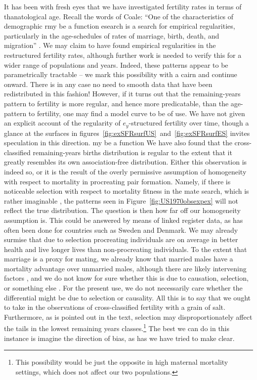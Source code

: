 It has been with fresh eyes that we have investigated fertility rates in terms
of thanatological age. Recall the words of Coale:
``One of the characteristics of demographic rmy be
a function esearch is a search for empirical regularities, particularly in the
age-schedules of rates of marriage, birth, death, and
migration'' \citep{coale1996development}. We may claim to have found
empirical regularities in the restructured fertility rates, although further
work is needed to verify this for a wider range of populations and years.
Indeed, these patterns appear to be parametrically tractable -- we mark this 
possibility with a cairn and continue onward. There is in any case no need to smooth data that
have been redistributed in this fashion! However, if it turns out that the
remaining-years pattern to fertility is more regular, and hence more
predicatable, than the age-pattern to fertility, one may find a model curve to
be of use. We have not given an explicit account of the regularity of
$e_y$-structured fertility over time, though a glance at the surfaces in
figures~\ref{fig:exSFRsurfUS}~and~\ref{fig:exSFRsurfES} invites speculation in
this direction.
my be
a function 
We have also found that the cross-classified remaining-years births distribution
is regular to the extent that it greatly resembles its own association-free
distribution. Either this observation is indeed so, or it is the result of the
overly permissive assumption of homogeneity with respect to mortality in
procreating pair formation. Namely, if there is noticeable selection with
respect to mortality fitness in the mate search, which is rather imaginable
\citep{gangestad1993pathogen, roberts2008good}, the patterns seen in
Figure~\ref{fig:US1970obsexpex} will not reflect the true distribution. The
question is then how far off our homogeneity assumption is. This could be
answered by means of linked register data, as has often been done for countries
such as Sweden and Denmark. We may already surmise that due to
selection procreating individuals are on average in better health and live
longer lives than non-procreating individuals. To the extent that marriage 
is a proxy for mating, we already know that married males have a
mortality advantage over unmarried males, although
there are likely intervening factors \citep[see
e.g.,][]{rogers1995marriage, waite1995does}, and we do not know for sure whether
this is due to causation, selection, or something else \citep[see
e.g.,][]{goldman1993marriage}. For the present use, we do not necessarily care 
whether the differential might be due to
selection or causality. All this is to say that we ought to take in the
observations of cross-classified fertility with a grain of salt. Furthermore, as
is pointed out in the text, selection may disproportionately affect the tails 
in the lowest remaining years classes.\footnote{This possibility would be just
the opposite in high maternal mortality settings, which does not affect
our two populations.} The best we can do in this instance is imagine the
direction of bias, as has we have tried to make clear.

